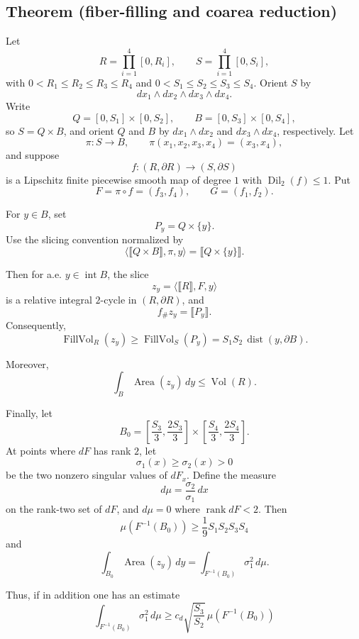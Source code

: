 \documentclass[12pt]{article}
\begin{document}

\date{}


\subsection*{Theorem (fiber-filling and coarea reduction)}

Let
\[
R=\prod_{i=1}^4[0,R_i],\qquad S=\prod_{i=1}^4[0,S_i],
\]
with \(0<R_1\le R_2\le R_3\le R_4\) and \(0<S_1\le S_2\le S_3\le S_4\). Orient \(S\) by
\[
dx_1\wedge dx_2\wedge dx_3\wedge dx_4.
\]
Write
\[
Q=[0,S_1]\times[0,S_2],\qquad B=[0,S_3]\times[0,S_4],
\]
so \(S=Q\times B\), and orient \(Q\) and \(B\) by \(dx_1\wedge dx_2\) and \(dx_3\wedge dx_4\), respectively. Let
\[
\pi:S\to B,\qquad \pi(x_1,x_2,x_3,x_4)=(x_3,x_4),
\]
and suppose
\[
f:(R,\partial R)\to(S,\partial S)
\]
is a Lipschitz finite piecewise smooth map of degree \(1\) with \(\operatorname{Dil}_2(f)\le 1\). Put
\[
F=\pi\circ f=(f_3,f_4),\qquad G=(f_1,f_2).
\]

For \(y\in B\), set
\[
P_y=Q\times\{y\}.
\]
Use the slicing convention normalized by
\[
\langle \llbracket Q\times B\rrbracket,\pi,y\rangle
=
\llbracket Q\times\{y\}\rrbracket .
\]

Then for a.e. \(y\in \operatorname{int}B\), the slice
\[
z_y=\langle \llbracket R\rrbracket,F,y\rangle
\]
is a relative integral \(2\)-cycle in \((R,\partial R)\), and
\[
f_\# z_y=\llbracket P_y\rrbracket .
\]
Consequently,
\[
\operatorname{FillVol}_R(z_y)\ge \operatorname{FillVol}_S(P_y)
=S_1S_2\,\operatorname{dist}(y,\partial B).
\]

Moreover,
\[
\int_B \operatorname{Area}(z_y)\,dy\le \operatorname{Vol}(R).
\]

Finally, let
\[
B_0=\left[\frac{S_3}{3},\frac{2S_3}{3}\right]\times
\left[\frac{S_4}{3},\frac{2S_4}{3}\right].
\]
At points where \(dF\) has rank \(2\), let
\[
\sigma_1(x)\ge \sigma_2(x)>0
\]
be the two nonzero singular values of \(dF_x\). Define the measure
\[
d\mu=\frac{\sigma_2}{\sigma_1}\,dx
\]
on the rank-two set of \(dF\), and \(d\mu=0\) where \(\operatorname{rank}dF<2\). Then
\[
\mu(F^{-1}(B_0))\ge \frac19 S_1S_2S_3S_4
\]
and
\[
\int_{B_0}\operatorname{Area}(z_y)\,dy
=
\int_{F^{-1}(B_0)}\sigma_1^2\,d\mu.
\]

Thus, if in addition one has an estimate
\[
\int_{F^{-1}(B_0)}\sigma_1^2\,d\mu
\ge
c_d\sqrt{\frac{S_3}{S_2}}\,
\mu(F^{-1}(B_0))
\]
\end{document}
